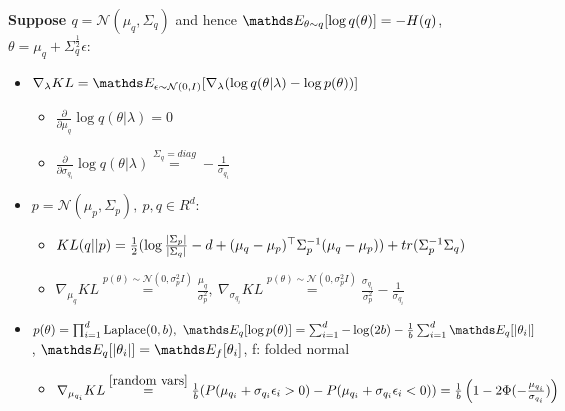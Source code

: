 \textbf{Suppose $q = \mathcal{N}(\mu_{q}, \Sigma_{q})$} and hence
$\E[\theta \sim q]{\log q(\theta)} = -H(q)$, $\theta = \mu_{q} + \Sigma_{q}^{\frac{1}{2}}\epsilon$:
\begin{itemize}
    \item $\nabla_{\lambda} KL = \E[\epsilon \sim \mathcal{N}(0,I)]{\nabla_{\lambda} (\log q(\theta| \lambda) - \log p(\theta))}$
    \begin{itemize}
        \item $\frac{\partial}{\partial \mu_{q}} \log q(\theta|\lambda) =0$
        \item $\frac{\partial}{\partial \sigma_{q_{i}}} \log q(\theta|\lambda) \overset{\Sigma_{q}=diag}{=} -\frac{1}{\sigma_{q_{i}}} $
    \end{itemize}
    \item $p=\mathcal{N}(\mu_{p}, \Sigma_{p}),\ p,q \in R^{d}$:
    \begin{itemize}
        \item $KL(q||p) = \frac{1}{2}(\log \frac{\left\lvert\Sigma_{p}\right\rvert}{\left\lvert\Sigma_{q}\right\rvert} -d +
        (\mu_{q}-\mu_{p})^{\top}\Sigma_{p}^{-1}(\mu_{q}-\mu_{p})) + tr(\Sigma_{p}^{-1} \Sigma_{q})$
        \item $\nabla_{\mu_{q}}KL \overset{p(\theta) \sim \mathcal{N}(0, \sigma_{p}^{2}I)}{=} \frac{\mu_{q}}{\sigma_{p}^{2}},\
        \nabla_{\sigma_{q_{i}}}KL \overset{p(\theta) \sim \mathcal{N}(0, \sigma_{p}^{2}I)}{=} \frac{\sigma_{q_{i}}}{\sigma_{p}^{2}}-
        \frac{1}{\sigma_{q_{i}}}$
    \end{itemize}
    \item
    $p(\theta) = \prod_{i=1}^{d} \text{Laplace}(0, b),\ \E[q]{\log p(\theta)} = \sum_{i=1}^{d}-\log(2b)
    - \frac{1}{b} \sum_{i=1}^{d}\E[q]{\abs{\theta_{i}}}$, $\E[q]{\abs{\theta_{i}}} = \E[f]{\theta_{i}}$,
    f: folded normal
    \begin{itemize}
        \item $\nabla_{\mu_{q_{i}}}KL \overset{\ref{random vars}}{=} \frac{1}{b}(P(\mu_{q_{i}}+\sigma_{q_{i}}\epsilon_{i} >0)-
        P(\mu_{q_{i}}+\sigma_{q_{i}}\epsilon_{i} < 0)) =
        \frac{1}{b}\left(1-2\Phi(-\frac{\mu_{q_{i}}}{\sigma_{q_{i}}})\right)$
    \end{itemize}
\end{itemize}


